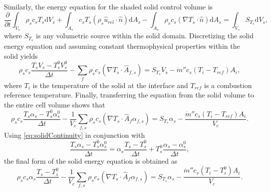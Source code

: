 \documentclass{article}
\renewcommand{\vec}[1]{\ensuremath{\hat{#1}}}
\renewcommand{\d}{\mathrm{d}}
\begin{document}
      Similarly, the energy equation for the shaded solid control volume is
      \begin{equation*}
          \frac{\partial}{\partial t} \int_{V_s} \rho_s c_s T_s \d V_s
        + \int_{A_s} c_s T_s (\rho_s \vec{u}_{rel} \cdot \vec{n}) \d A_s
        - \int_{A_s} \rho_s c_s (\nabla T_s \cdot \vec{n}) \d A_s
        = \int_{V_s} S_{T_s} \d V_s,
      \end{equation*}
      where $S_{T_s}$ is any volumetric source within the solid domain. Discretizing the solid energy equation and assuming constant thermophysical properties within the solid yields
      \begin{equation*}
          \rho_s c_s \frac{T_s V_s - T_s^0 V_s^0}{\Delta t}
        - \sum_{f} \rho_s c_s (\nabla T_s \cdot \vec{A}_{f,s})
        = S_{T_s} V_s - \dot{m}'' c_s (T_i - T_{ref}) A_i,
      \end{equation*}
      where $T_i$ is the temperature of the solid at the interface and $T_{ref}$ is a combustion reference temperature.
      Finally, transferring the equation from the solid volume to the entire cell volume shows that
      \begin{equation*}
          \rho_s c_s \frac{T_s \alpha_s - T_s^0 \alpha_s^0}{\Delta t}
        - \frac{1}{V_c}\sum_{f,s} \rho_s c_s (\nabla T_s \cdot \vec{A}_{f}\alpha_{f,s})
        = S_{T_s} \alpha_s - \frac{\dot{m}'' c_s (T_i - T_{ref}) A_i}{V_c}.
      \end{equation*}
      Using \eqref{eq:solidContinuity} in conjunction with
      \begin{equation*}
          \frac{T_s \alpha_s - T_s^0 \alpha_s^0}{\Delta t}
        = \alpha_s \frac{T_s - T_s^0}{\Delta t} + T_s^0 \frac{\alpha_s - \alpha_s^0}{\Delta t},
      \end{equation*}
      the final form of the solid energy equation is obtained as
      \begin{equation}
          \rho_s c_s \alpha_s \frac{T_s - T_s^0}{\Delta t}
        - \frac{1}{V_c}\sum_{f,s} \rho_s c_s (\nabla T_s \cdot \vec{A}_{f}\alpha_{f,s})
        = S_{T_s} \alpha_s - \frac{\dot{m}'' c_s (T_i - T_s^0) A_i}{V_c}.
      \end{equation}
\end{document}
